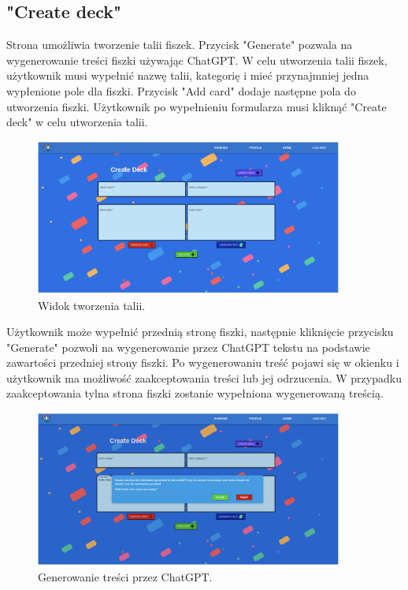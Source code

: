 \subsection{"Create deck"}
Strona umożliwia tworzenie talii fiszek. Przycisk "Generate" pozwala na wygenerowanie treści fiszki używając ChatGPT. W celu utworzenia talii fiszek, użytkownik musi wypełnić nazwę talii, kategorię i mieć przynajmniej jedna wypłenione pole dla fiszki. Przycisk "Add card" dodaje następne pola do utworzenia fiszki. Użytkownik po wypełnieniu formularza musi kliknąć "Create deck" w celu utworzenia talii.


\begin{figure}[H]
    \centering
    \includegraphics[width=0.9\textwidth]{chapters/chapter_10/images_web/web_create_deck}
    \caption{Widok tworzenia talii.}
    \label{img:web_create_deck}
\end{figure}


Użytkownik może wypełnić przednią stronę fiszki, następnie kliknięcie przycisku "Generate" pozwoli na wygenerowanie przez ChatGPT tekstu na podstawie zawartości przedniej strony fiszki. Po wygenerowaniu treść pojawi się w okienku i użytkownik ma możliwość zaakceptowania treści lub jej odrzucenia. W przypadku zaakceptowania tylna strona fiszki zostanie wypełniona wygenerowaną treścią.


\begin{figure}[H]
    \centering
    \includegraphics[width=0.9\textwidth]{chapters/chapter_10/images_web/web_chat}
    \caption{Generowanie treści przez ChatGPT.}
    \label{img:web_chat}
\end{figure}


